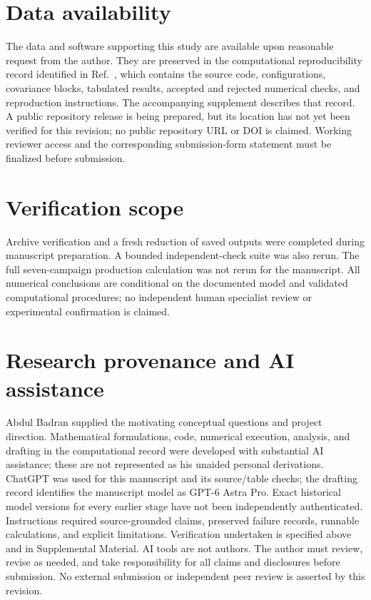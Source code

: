 \documentclass[aps,prd,reprint,floatfix,nofootinbib,longbibliography]{revtex4-2}
\begin{document}
\section*{Data availability}
The data and software supporting this study are available upon reasonable request from the author. They are preserved in the computational reproducibility record identified in Ref.~\cite{NumericalArchive}, which contains the source code, configurations, covariance blocks, tabulated results, accepted and rejected numerical checks, and reproduction instructions. The accompanying supplement describes that record. A public repository release is being prepared, but its location has not yet been verified for this revision; no public repository URL or DOI is claimed. Working reviewer access and the corresponding submission-form statement must be finalized before submission.

\section*{Verification scope}
Archive verification and a fresh reduction of saved outputs were completed during manuscript preparation. A bounded independent-check suite was also rerun. The full seven-campaign production calculation was not rerun for the manuscript. All numerical conclusions are conditional on the documented model and validated computational procedures; no independent human specialist review or experimental confirmation is claimed.

\section*{Research provenance and AI assistance}
Abdul Badran supplied the motivating conceptual questions and project direction. Mathematical formulations, code, numerical execution, analysis, and drafting in the computational record were developed with substantial AI assistance; these are not represented as his unaided personal derivations. ChatGPT was used for this manuscript and its source/table checks; the drafting record identifies the manuscript model as GPT-6 Astra Pro. Exact historical model versions for every earlier stage have not been independently authenticated. Instructions required source-grounded claims, preserved failure records, runnable calculations, and explicit limitations. Verification undertaken is specified above and in Supplemental Material. AI tools are not authors. The author must review, revise as needed, and take responsibility for all claims and disclosures before submission. No external submission or independent peer review is asserted by this revision.


\end{document}
